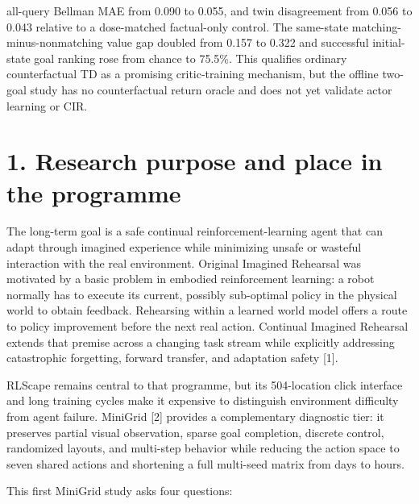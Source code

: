 \documentclass[10pt,a4paper]{article}
\newcommand{\reportsection}[1]{\section{#1}}
\begin{document}
all-query Bellman MAE from 0.090 to 0.055, and twin disagreement from 0.056 to 0.043 relative to a dose-matched factual-only control. The same-state matching-minus-nonmatching value gap doubled from 0.157 to 0.322 and successful initial-state goal ranking rose from chance to 75.5\%. This qualifies ordinary counterfactual TD as a promising critic-training mechanism, but the offline two-goal study has no counterfactual return oracle and does not yet validate actor learning or CIR.
\endgroup
\clearpage
\tableofcontents
\clearpage
\reportsection{1. Research purpose and place in the programme}
The long-term goal is a safe continual reinforcement-learning agent that can adapt through imagined experience while minimizing unsafe or wasteful interaction with the real environment. Original Imagined Rehearsal was motivated by a basic problem in embodied reinforcement learning: a robot normally has to execute its current, possibly sub-optimal policy in the physical world to obtain feedback. Rehearsing within a learned world model offers a route to policy improvement before the next real action. Continual Imagined Rehearsal extends that premise across a changing task stream while explicitly addressing catastrophic forgetting, forward transfer, and adaptation safety [1].

RLScape remains central to that programme, but its 504-location click interface and long training cycles make it expensive to distinguish environment difficulty from agent failure. MiniGrid [2] provides a complementary diagnostic tier: it preserves partial visual observation, sparse goal completion, discrete control, randomized layouts, and multi-step behavior while reducing the action space to seven shared actions and shortening a full multi-seed matrix from days to hours.

This first MiniGrid study asks four questions:
\end{document}
